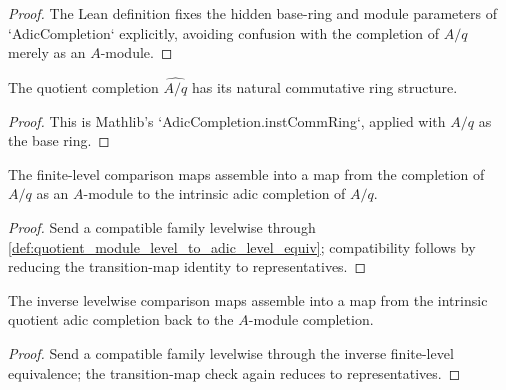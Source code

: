 \begin{proof}
  The Lean definition fixes the hidden base-ring and module parameters of
  `AdicCompletion` explicitly, avoiding confusion with the completion of
  \(A/q\) merely as an \(A\)-module.
\end{proof}

\begin{lemma}
  \label{lem:quotient_adic_completion_comm_ring}
  The quotient completion \( \widehat{A/q}\) has its natural commutative ring
  structure.
\end{lemma}

\begin{proof}
  This is Mathlib's `AdicCompletion.instCommRing`, applied with \(A/q\) as the
  base ring.
\end{proof}

\begin{definition}
  \label{def:quotient_module_completion_to_quotient_adic_completion}
  The finite-level comparison maps assemble into a map from the completion of
  \(A/q\) as an \(A\)-module to the intrinsic adic completion of \(A/q\).
\end{definition}

\begin{proof}
  Send a compatible family levelwise through
  \cref{def:quotient_module_level_to_adic_level_equiv}; compatibility follows
  by reducing the transition-map identity to representatives.
\end{proof}

\begin{definition}
  \label{def:quotient_adic_completion_to_quotient_module_completion}
  The inverse levelwise comparison maps assemble into a map from the intrinsic
  quotient adic completion back to the \(A\)-module completion.
\end{definition}

\begin{proof}
  Send a compatible family levelwise through the inverse finite-level
  equivalence; the transition-map check again reduces to representatives.
\end{proof}

